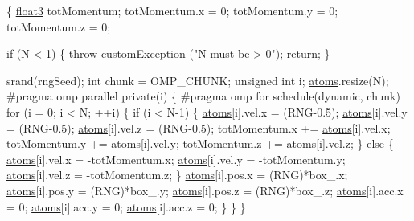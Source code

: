 \begin{DoxyCode}
                                                                 \{
    \hyperlink{structfloat3}{float3} totMomentum;
    totMomentum.x = 0; totMomentum.y = 0; totMomentum.z = 0;

    \textcolor{keywordflow}{if} (N < 1) \{
        \textcolor{keywordflow}{throw} \hyperlink{classcustom_exception}{customException} (\textcolor{stringliteral}{"N must be > 0"});
        \textcolor{keywordflow}{return};
    \}

    srand(rngSeed);
    \textcolor{keywordtype}{int} chunk = OMP\_CHUNK;
    \textcolor{keywordtype}{unsigned} \textcolor{keywordtype}{int} i;
    \hyperlink{classsystem_definition_ae8814d3f60fc1111af2a3f218a4bfcab}{atoms}.resize(N);
\textcolor{preprocessor}{#pragma omp parallel private(i)}
\textcolor{preprocessor}{}    \{
\textcolor{preprocessor}{#pragma omp for schedule(dynamic, chunk)}
\textcolor{preprocessor}{}    \textcolor{keywordflow}{for} (i = 0; i < N; ++i) \{
        \textcolor{keywordflow}{if} (i < N-1) \{
            \hyperlink{classsystem_definition_ae8814d3f60fc1111af2a3f218a4bfcab}{atoms}[i].vel.x = (RNG-0.5);
            \hyperlink{classsystem_definition_ae8814d3f60fc1111af2a3f218a4bfcab}{atoms}[i].vel.y = (RNG-0.5);
            \hyperlink{classsystem_definition_ae8814d3f60fc1111af2a3f218a4bfcab}{atoms}[i].vel.z = (RNG-0.5);
            totMomentum.x += \hyperlink{classsystem_definition_ae8814d3f60fc1111af2a3f218a4bfcab}{atoms}[i].vel.x;
            totMomentum.y += \hyperlink{classsystem_definition_ae8814d3f60fc1111af2a3f218a4bfcab}{atoms}[i].vel.y;
            totMomentum.z += \hyperlink{classsystem_definition_ae8814d3f60fc1111af2a3f218a4bfcab}{atoms}[i].vel.z;
        \} \textcolor{keywordflow}{else} \{
            \hyperlink{classsystem_definition_ae8814d3f60fc1111af2a3f218a4bfcab}{atoms}[i].vel.x = -totMomentum.x;
            \hyperlink{classsystem_definition_ae8814d3f60fc1111af2a3f218a4bfcab}{atoms}[i].vel.y = -totMomentum.y;
            \hyperlink{classsystem_definition_ae8814d3f60fc1111af2a3f218a4bfcab}{atoms}[i].vel.z = -totMomentum.z;
        \}
        \hyperlink{classsystem_definition_ae8814d3f60fc1111af2a3f218a4bfcab}{atoms}[i].pos.x = (RNG)*box\_.x;
        \hyperlink{classsystem_definition_ae8814d3f60fc1111af2a3f218a4bfcab}{atoms}[i].pos.y = (RNG)*box\_.y;
        \hyperlink{classsystem_definition_ae8814d3f60fc1111af2a3f218a4bfcab}{atoms}[i].pos.z = (RNG)*box\_.z;
        \hyperlink{classsystem_definition_ae8814d3f60fc1111af2a3f218a4bfcab}{atoms}[i].acc.x = 0;
        \hyperlink{classsystem_definition_ae8814d3f60fc1111af2a3f218a4bfcab}{atoms}[i].acc.y = 0;
        \hyperlink{classsystem_definition_ae8814d3f60fc1111af2a3f218a4bfcab}{atoms}[i].acc.z = 0;
    \}
    \}
\}
\end{DoxyCode}
